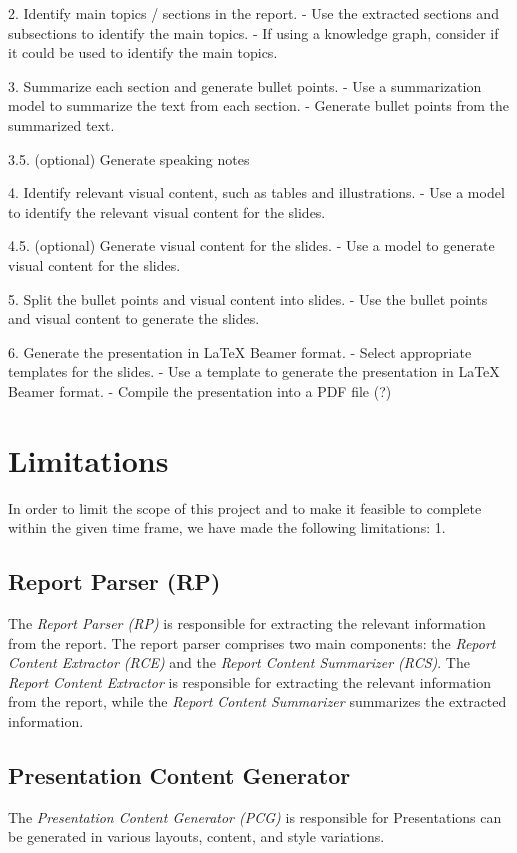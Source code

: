 2. Identify main topics / sections in the report.
    - Use the extracted sections and subsections to identify the main topics.
    - If using a knowledge graph, consider if it could be used to identify the main topics.

3. Summarize each section and generate bullet points.
    - Use a summarization model to summarize the text from each section.
    - Generate bullet points from the summarized text.

3.5. (optional) Generate speaking notes

4. Identify relevant visual content, such as tables and illustrations.
    - Use a model to identify the relevant visual content for the slides.
    
4.5. (optional) Generate visual content for the slides.
    - Use a model to generate visual content for the slides.

5. Split the bullet points and visual content into slides.
    - Use the bullet points and visual content to generate the slides.

6. Generate the presentation in \LaTeX{} Beamer format.
    - Select appropriate templates for the slides.
    - Use a template to generate the presentation in \LaTeX{} Beamer format.
    - Compile the presentation into a PDF file (?)

\section{Limitations}
In order to limit the scope of this project and to make it feasible to complete within the given time frame, we have made the following limitations:
1. 

\subsection{Report Parser (RP)}
The \emph{Report Parser (RP)} is responsible for extracting the relevant information from the report. The report parser comprises two main components: the \emph{Report Content Extractor (RCE)} and the \emph{Report Content Summarizer (RCS)}. The \emph{Report Content Extractor} is responsible for extracting the relevant information from the report, while the \emph{Report Content Summarizer} summarizes the extracted information.

\subsection{Presentation Content Generator}
The \emph{Presentation Content Generator (PCG)} is responsible for 
Presentations can be generated in various layouts, content, and style variations. 

